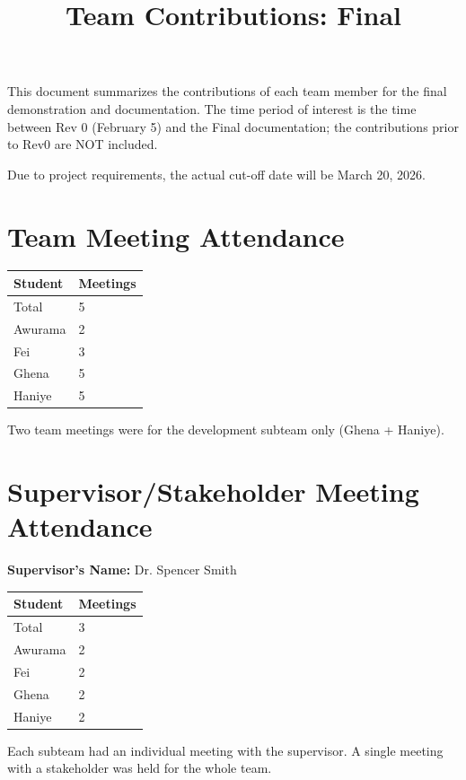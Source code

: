 \documentclass{article}
\title{Team Contributions: Final\\\progname}
\author{\authname}
\date{}
\begin{document}
\maketitle

This document summarizes the contributions of each team member for the final
demonstration and documentation.  The time period of interest is the time
between Rev 0 (February 5) and the Final documentation; the contributions prior to Rev0 are
NOT included.

Due to project requirements, the actual cut-off date will be March 20, 2026.

\section{Team Meeting Attendance}

\begin{table}[H]
\centering
\begin{tabular}{ll}
\toprule
\textbf{Student} & \textbf{Meetings}\\
\midrule
Total & 5\\
Awurama & 2\\
Fei & 3\\
Ghena & 5\\
Haniye & 5\\

\bottomrule
\end{tabular}
\end{table}

Two team meetings were for the development subteam only (Ghena + Haniye).

\section{Supervisor/Stakeholder Meeting Attendance}

\noindent \textbf{Supervisor's Name: } Dr. Spencer Smith

\begin{table}[H]
\centering
\begin{tabular}{ll}
\toprule
\textbf{Student} & \textbf{Meetings}\\
\midrule
Total & 3\\
Awurama & 2\\
Fei & 2\\
Ghena & 2\\
Haniye & 2\\
\bottomrule
\end{tabular}
\end{table}
Each subteam had an individual meeting with the supervisor. A single meeting with a stakeholder was held for the whole team.
\end{document}
